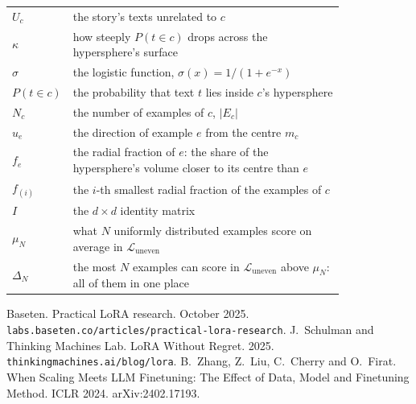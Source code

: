 \documentclass[11pt]{article}
\makeatletter
\theoremstyle{remark}
\newenvironment{symbols}
  {\par\smallskip\noindent\small\begin{tabular}{@{}>{$}l<{$}@{\quad}p{0.82\linewidth}@{}}}
  {\end{tabular}\par\medskip}
\makeatother
\begin{document}
\begin{symbols}
U_c & the story's texts unrelated to $c$ \\
\kappa & how steeply $P(t \in c)$ drops across the hypersphere's surface \\
\sigma & the logistic function, $\sigma(x) = 1 / (1 + e^{-x})$ \\
P(t \in c) & the probability that text $t$ lies inside $c$'s hypersphere \\
N_c & the number of examples of $c$, $|E_c|$ \\
u_e & the direction of example $e$ from the centre $m_c$ \\
f_e & the radial fraction of $e$: the share of the hypersphere's volume closer to its centre than $e$ \\
f_{(i)} & the $i$-th smallest radial fraction of the examples of $c$ \\
I & the $d \times d$ identity matrix \\
\mu_N & what $N$ uniformly distributed examples score on average in $\mathcal{L}_{\mathrm{uneven}}$ \\
\Delta_N & the most $N$ examples can score in $\mathcal{L}_{\mathrm{uneven}}$ above $\mu_N$: all of them in one place \\
\end{symbols}

\begin{thebibliography}{9}
 Baseten. Practical LoRA research. October 2025. \texttt{labs.baseten.co/\allowbreak articles/\allowbreak practical-lora-research}.
 J.~Schulman and Thinking Machines Lab. LoRA Without Regret. 2025. \texttt{thinkingmachines.ai/blog/lora}.
 B.~Zhang, Z.~Liu, C.~Cherry and O.~Firat. When Scaling Meets LLM Finetuning: The Effect of Data, Model and Finetuning Method. ICLR 2024. arXiv:2402.17193.
\end{thebibliography}
\end{document}
